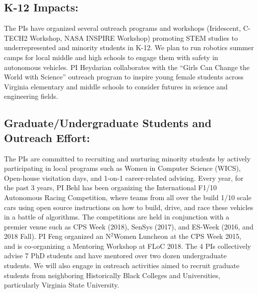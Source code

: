 \subsection{K-12 Impacts:}
The PIs have organized several outreach programs and workshops (Iridescent, C-TECH2 Workshop, NASA INSPIRE Workshop) promoting STEM studies to underrepresented and minority students in K-12. 
We plan to run robotics summer camps for local middle and high schools to engage them with safety in autonomous vehicles.
PI Heydarian collaborates with the ``Girls Can Change the World with Science'' outreach program to inspire young female students across Virginia elementary and middle schools to consider futures in science and engineering fields. 

\subsection{Graduate/Undergraduate Students and Outreach Effort:}
The PIs are committed to recruiting and nurturing minority students by actively participating in local programs such as Women in Computer Science (WICS),  Open-house visitation days, and 1-on-1 career-related advising.
Every year, for the past 3 years, PI Behl has been organizing the International F1/10 Autonomous Racing Competition, where teams from all over the build 1/10 scale cars using open source instructions on how to build, drive, and race these vehicles in a battle of algorithms. The competitions are held in conjunction with a premier venue such as CPS Week (2018), SenSys (2017), and ES-Week (2016, and 2018 Fall). 
PI Feng organized an N$^2$Women Luncheon at the CPS Week 2015, and is co-organizing a Mentoring Workshop at FLoC 2018. The 4 PIs collectively advise 7 PhD students and have mentored over two dozen undergraduate students.
We will also engage in outreach activities aimed to recruit graduate students from neighboring Historically Black Colleges and Universities, particularly Virginia State University.

